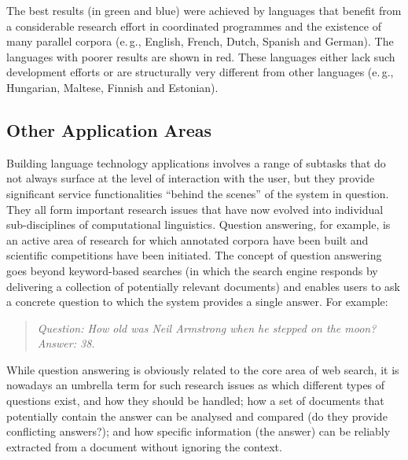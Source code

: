 \begin{multicols}{2}
The best results (in green and blue) were achieved by languages that benefit from a considerable research effort in coordinated programmes and the existence of many parallel corpora (e.\,g., English, French, Dutch, Spanish and German). The languages with poorer results are shown in red. These languages either lack such development efforts or are structurally very different from other languages (e.\,g., Hungarian, Maltese, Finnish and Estonian).

\subsection{Other Application Areas}

Building language technology applications involves a range of subtasks
that do not always surface at the level of interaction with the user,
but they provide significant service functionalities ``behind the
scenes'' of the system in question. They all form important research
issues that have now evolved into individual sub-disciplines of
computational linguistics.  Question answering, for example, is an
active area of research for which annotated corpora have been built
and scientific competitions have been initiated. The concept of
question answering goes beyond keyword-based searches (in which the
search engine responds by delivering a collection of potentially
relevant documents) and enables users to ask a concrete question to
which the system provides a single answer. For example: 

\begin{quote}
\textit{Question: How old was Neil Armstrong when he stepped on the moon?}\\
\textit{Answer: 38.}
\end{quote}

While question answering is obviously related to the core area of web search, it is nowadays an umbrella term for such research issues as which different types of questions exist, and how they should be handled; how a set of documents that potentially contain the answer can be analysed and compared (do they provide conflicting answers?); and how specific information (the answer) can be reliably extracted from a document without ignoring the context. 



\end{multicols}
